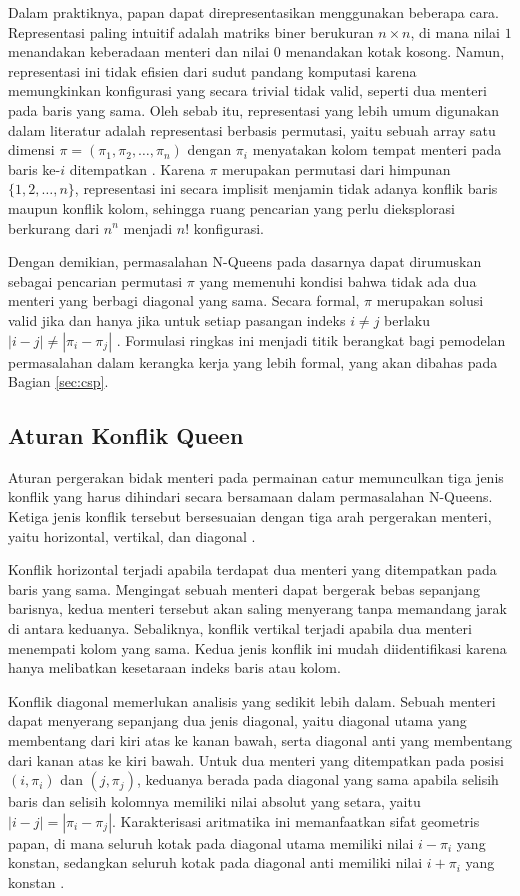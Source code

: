 Dalam praktiknya, papan dapat direpresentasikan menggunakan beberapa cara. Representasi paling intuitif adalah matriks biner berukuran $n \times n$, di mana nilai $1$ menandakan keberadaan menteri dan nilai $0$ menandakan kotak kosong. Namun, representasi ini tidak efisien dari sudut pandang komputasi karena memungkinkan konfigurasi yang secara trivial tidak valid, seperti dua menteri pada baris yang sama. Oleh sebab itu, representasi yang lebih umum digunakan dalam literatur adalah representasi berbasis permutasi, yaitu sebuah array satu dimensi $\pi = (\pi_1, \pi_2, \dots, \pi_n)$ dengan $\pi_i$ menyatakan kolom tempat menteri pada baris ke-$i$ ditempatkan \cite{glock2022n}. Karena $\pi$ merupakan permutasi dari himpunan $\{1, 2, \dots, n\}$, representasi ini secara implisit menjamin tidak adanya konflik baris maupun konflik kolom, sehingga ruang pencarian yang perlu dieksplorasi berkurang dari $n^n$ menjadi $n!$ konfigurasi.

Dengan demikian, permasalahan N-Queens pada dasarnya dapat dirumuskan sebagai pencarian permutasi $\pi$ yang memenuhi kondisi bahwa tidak ada dua menteri yang berbagi diagonal yang sama. Secara formal, $\pi$ merupakan solusi valid jika dan hanya jika untuk setiap pasangan indeks $i \neq j$ berlaku $|i - j| \neq |\pi_i - \pi_j|$ \cite{glock2022n}. Formulasi ringkas ini menjadi titik berangkat bagi pemodelan permasalahan dalam kerangka kerja yang lebih formal, yang akan dibahas pada Bagian \ref{sec:csp}.

\subsection{Aturan Konflik Queen}
\label{subsec:n-queens-aturan}
Aturan pergerakan bidak menteri pada permainan catur memunculkan tiga jenis konflik yang harus dihindari secara bersamaan dalam permasalahan N-Queens. Ketiga jenis konflik tersebut bersesuaian dengan tiga arah pergerakan menteri, yaitu horizontal, vertikal, dan diagonal \cite{bell2009survey}.

Konflik horizontal terjadi apabila terdapat dua menteri yang ditempatkan pada baris yang sama. Mengingat sebuah menteri dapat bergerak bebas sepanjang barisnya, kedua menteri tersebut akan saling menyerang tanpa memandang jarak di antara keduanya. Sebaliknya, konflik vertikal terjadi apabila dua menteri menempati kolom yang sama. Kedua jenis konflik ini mudah diidentifikasi karena hanya melibatkan kesetaraan indeks baris atau kolom.

Konflik diagonal memerlukan analisis yang sedikit lebih dalam. Sebuah menteri dapat menyerang sepanjang dua jenis diagonal, yaitu diagonal utama yang membentang dari kiri atas ke kanan bawah, serta diagonal anti yang membentang dari kanan atas ke kiri bawah. Untuk dua menteri yang ditempatkan pada posisi $(i, \pi_i)$ dan $(j, \pi_j)$, keduanya berada pada diagonal yang sama apabila selisih baris dan selisih kolomnya memiliki nilai absolut yang setara, yaitu $|i - j| = |\pi_i - \pi_j|$. Karakterisasi aritmatika ini memanfaatkan sifat geometris papan, di mana seluruh kotak pada diagonal utama memiliki nilai $i - \pi_i$ yang konstan, sedangkan seluruh kotak pada diagonal anti memiliki nilai $i + \pi_i$ yang konstan \cite{russell2020artificial}.

